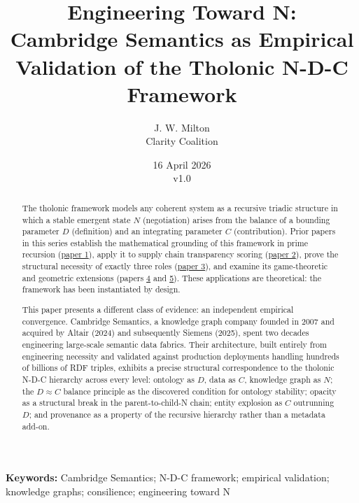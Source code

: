 \documentclass[12pt]{article}
\title{Engineering Toward N:\\
\large Cambridge Semantics as Empirical Validation of the Tholonic N-D-C Framework}
\author{J. W. Milton\\[4pt]{\small Clarity Coalition}}
\date{\small 16 April 2026 \\ v1.0}
\begin{document}
\maketitle

\noindent\textbf{Keywords:} Cambridge Semantics; N-D-C framework; empirical validation; knowledge graphs; consilience; engineering toward N

\begin{abstract}
The tholonic framework models any coherent system as a recursive triadic
structure in which a stable emergent state \(N\) (negotiation) arises
from the balance of a bounding parameter \(D\) (definition) and an
integrating parameter \(C\) (contribution). Prior papers in this series
establish the mathematical grounding of this framework in prime
recursion
(\href{https://github.com/baardev/truevalue/blob/main/docnav/Research/papers/1_recursive-tholonic-five-constants/1_recursive-tholonic-five-constants.pdf}{paper
1}), apply it to supply chain transparency scoring
(\href{https://github.com/baardev/truevalue/blob/main/docnav/Research/papers/2_supply-chain-transparency-tvpci/2_supply-chain-transparency-tvpci.pdf}{paper
2}), prove the structural necessity of exactly three roles
(\href{https://github.com/baardev/truevalue/blob/main/docnav/Research/papers/3_minimal-recursive-triadic-framework/3_minimal-recursive-triadic-framework.pdf}{paper
3}), and examine its game-theoretic and geometric extensions (papers
\href{https://github.com/baardev/truevalue/blob/main/docnav/Research/papers/4_game-theoretic-triadic-balance/4_game-theoretic-triadic-balance.pdf}{4}
and
\href{https://github.com/baardev/truevalue/blob/main/docnav/Research/papers/5_tholonic-twistor-connection/5_tholonic-twistor-connection.pdf}{5}).
These applications are theoretical: the framework has been instantiated
by design.

This paper presents a different class of evidence: an independent
empirical convergence. Cambridge Semantics, a knowledge graph company
founded in 2007 and acquired by Altair (2024) and subsequently Siemens
(2025), spent two decades engineering large-scale semantic data fabrics.
Their architecture, built entirely from engineering necessity and
validated against production deployments handling hundreds of billions
of RDF triples, exhibits a precise structural correspondence to the
tholonic N-D-C hierarchy across every level: ontology as \(D\), data as
\(C\), knowledge graph as \(N\); the \(D \approx C\) balance principle
as the discovered condition for ontology stability; opacity as a
structural break in the parent-to-child-N chain; entity explosion as
\(C\) outrunning \(D\); and provenance as a property of the recursive
hierarchy rather than a metadata add-on.


\end{abstract}
\end{document}

